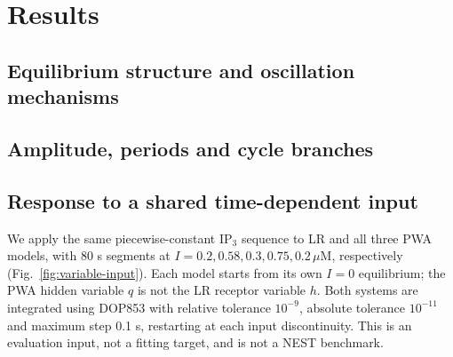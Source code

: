 \documentclass[final,5p,times,twocolumn]{elsarticle}
\begin{document}
\section{Results}
\label{sec:results}

\subsection{Equilibrium structure and oscillation mechanisms}


\subsection{Amplitude, periods and cycle branches}

\subsection{Response to a shared time-dependent input}
We apply the same piecewise-constant IP$_3$ sequence to LR and all three PWA
models, with 80 s segments at $I=0.2,0.58,0.3,0.75,0.2\,\mu$M, respectively
(Fig.~\ref{fig:variable-input}). Each model starts from its own $I=0$
equilibrium; the PWA hidden variable $q$ is not the LR receptor variable $h$.
Both systems are integrated using DOP853 with relative tolerance $10^{-9}$,
absolute tolerance $10^{-11}$ and maximum step 0.1 s, restarting at each
input discontinuity. This is an evaluation input, not a fitting target, and
is not a NEST benchmark.
\end{document}
